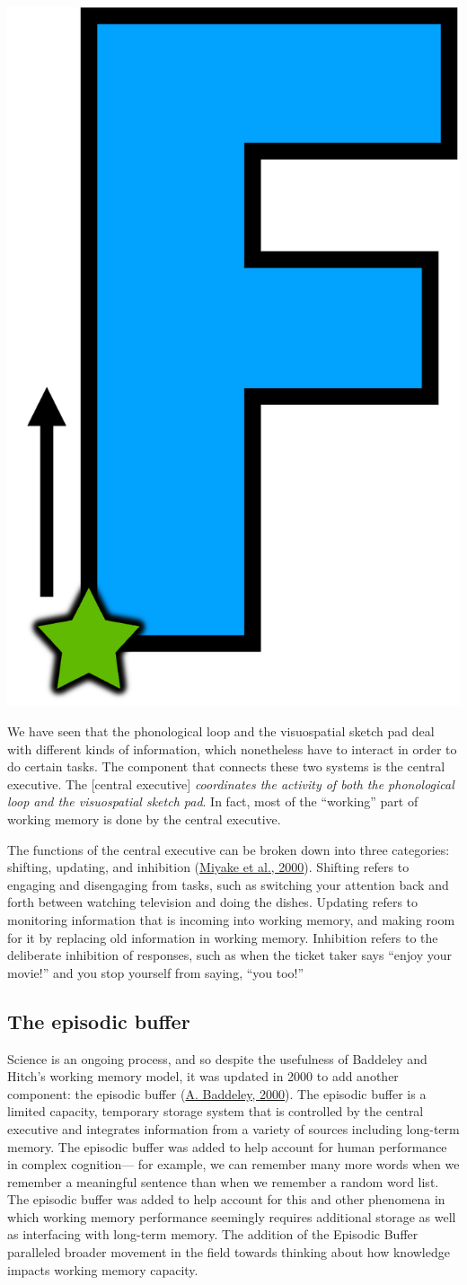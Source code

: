 \documentclass[
]{krantz}
\begin{document}
\begin{center}\includegraphics[width=0.1\linewidth]{images/ch4/fig3} \end{center}

We have seen that the phonological loop and the visuospatial sketch pad deal with different kinds of information, which nonetheless have to interact in order to do certain tasks. The component that connects these two systems is the central executive. The {[}central executive{]} \emph{coordinates the activity of both the phonological loop and the visuospatial sketch pad}. In fact, most of the ``working'' part of working memory is done by the central executive.

The functions of the central executive can be broken down into three categories: shifting, updating, and inhibition (\protect\hyperlink{ref-Miyake2000}{Miyake et al., 2000}). Shifting refers to engaging and disengaging from tasks, such as switching your attention back and forth between watching television and doing the dishes. Updating refers to monitoring information that is incoming into working memory, and making room for it by replacing old information in working memory. Inhibition refers to the deliberate inhibition of responses, such as when the ticket taker says ``enjoy your movie!'' and you stop yourself from saying, ``you too!''

\hypertarget{the-episodic-buffer}{%
\subsection*{The episodic buffer}\label{the-episodic-buffer}}


Science is an ongoing process, and so despite the usefulness of Baddeley and Hitch's working memory model, it was updated in 2000 to add another component: the episodic buffer (\protect\hyperlink{ref-Baddeley2000}{A. Baddeley, 2000}). The episodic buffer is a limited capacity, temporary storage system that is controlled by the central executive and integrates information from a variety of sources including long-term memory. The episodic buffer was added to help account for human performance in complex cognition--- for example, we can remember many more words when we remember a meaningful sentence than when we remember a random word list. The episodic buffer was added to help account for this and other phenomena in which working memory performance seemingly requires additional storage as well as interfacing with long-term memory. The addition of the Episodic Buffer paralleled broader movement in the field towards thinking about how knowledge impacts working memory capacity.
\end{document}
